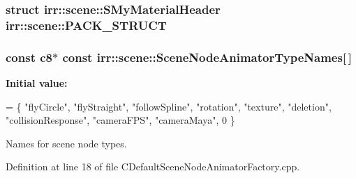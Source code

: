 \hypertarget{namespaceirr_1_1scene_afee0766eb2e638daf8735faf12ee786d}{
\subsubsection[{P\-A\-C\-K\-\_\-\-S\-T\-R\-U\-C\-T}]{\setlength{\rightskip}{0pt plus 5cm}struct {\bf irr\-::scene\-::\-S\-My\-Material\-Header} irr\-::scene\-::\-P\-A\-C\-K\-\_\-\-S\-T\-R\-U\-C\-T}}\label{namespaceirr_1_1scene_afee0766eb2e638daf8735faf12ee786d}
\hypertarget{namespaceirr_1_1scene_ad9c721d63e1ed3fe2e3661eb419de5eb}{
\subsubsection[{Scene\-Node\-Animator\-Type\-Names}]{\setlength{\rightskip}{0pt plus 5cm}const c8$\ast$ const irr\-::scene\-::\-Scene\-Node\-Animator\-Type\-Names\mbox{[}$\,$\mbox{]}}}\label{namespaceirr_1_1scene_ad9c721d63e1ed3fe2e3661eb419de5eb}
{\bfseries Initial value\-:}
\begin{DoxyCode}
=
\{
    \textcolor{stringliteral}{"flyCircle"},
    \textcolor{stringliteral}{"flyStraight"},
    \textcolor{stringliteral}{"followSpline"},
    \textcolor{stringliteral}{"rotation"},
    \textcolor{stringliteral}{"texture"},
    \textcolor{stringliteral}{"deletion"},
    \textcolor{stringliteral}{"collisionResponse"},
    \textcolor{stringliteral}{"cameraFPS"},
    \textcolor{stringliteral}{"cameraMaya"},
    0
\}
\end{DoxyCode}


Names for scene node types. 



Definition at line 18 of file C\-Default\-Scene\-Node\-Animator\-Factory.\-cpp.

